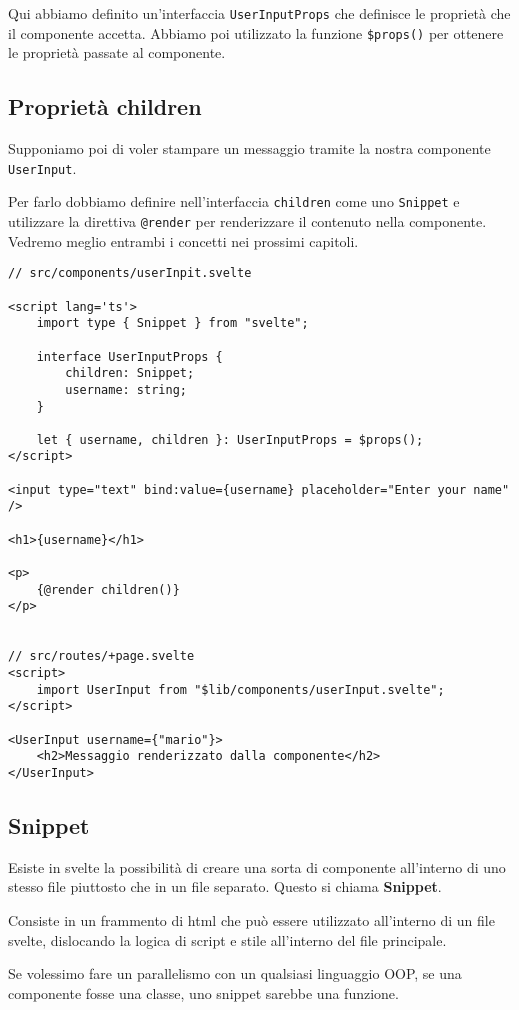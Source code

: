 \documentclass[12pt]{article}
\newcommand{\important}[1]{\textcolor{accent}{\textbf{#1}}}
\begin{document}
Qui abbiamo definito un'interfaccia \texttt{UserInputProps} che definisce
le proprietà che il componente accetta. 
Abbiamo poi utilizzato la funzione \texttt{\$props()} per ottenere le proprietà
passate al componente.

\subsection{Proprietà children}
Supponiamo poi di voler stampare un messaggio tramite la nostra 
componente \texttt{UserInput}.

Per farlo dobbiamo definire nell'interfaccia \texttt{children}
come uno \texttt{Snippet} e utilizzare la direttiva \texttt{@render}
per renderizzare il contenuto nella componente. Vedremo meglio
entrambi i concetti nei prossimi capitoli.

\begin{verbatim}
// src/components/userInpit.svelte

<script lang='ts'>
	import type { Snippet } from "svelte";

    interface UserInputProps {
        children: Snippet;
        username: string;
    }

    let { username, children }: UserInputProps = $props();
</script>

<input type="text" bind:value={username} placeholder="Enter your name" />

<h1>{username}</h1>

<p>
    {@render children()}
</p>


// src/routes/+page.svelte
<script>
    import UserInput from "$lib/components/userInput.svelte";
</script>

<UserInput username={"mario"}>
    <h2>Messaggio renderizzato dalla componente</h2>
</UserInput>
\end{verbatim}

\subsection{Snippet}
Esiste in svelte la possibilità di creare una sorta di componente
all'interno di uno stesso file piuttosto che in un file
separato. Questo si chiama \important{Snippet}.

Consiste in un frammento di html che può essere utilizzato
all'interno di un file svelte, dislocando la logica di script
e stile all'interno del file principale.

Se volessimo fare un parallelismo con un qualsiasi linguaggio 
OOP, se una componente fosse una classe, uno snippet sarebbe
una funzione.
\end{document}
